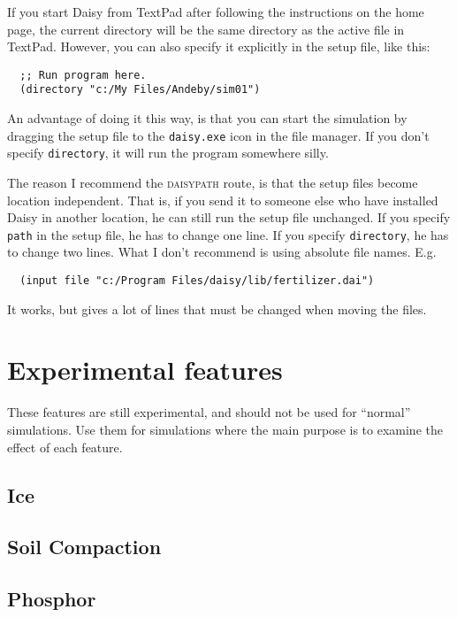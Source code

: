 \documentclass[a4paper]{article}
\begin{document}
If you start Daisy from TextPad after following the instructions on
the home page, the current directory will be the same directory as the
active file in TextPad.  However, you can also specify it explicitly
in the setup file, like this:
\begin{verbatim}
  ;; Run program here.
  (directory "c:/My Files/Andeby/sim01")
\end{verbatim}
An advantage of doing it this way, is that you can start the simulation
by dragging the setup file to the \texttt{daisy.exe} icon in the file
manager.  If you don't specify \texttt{directory}, it will run the
program somewhere silly.

The reason I recommend the \textsc{daisypath} route, is that the setup
files become location independent.  That is, if you send it to someone
else who have installed Daisy in another location, he can still run
the setup file unchanged.  If you specify \texttt{path} in the setup
file, he has to change one line.  If you specify \texttt{directory},
he has to change two lines.  What I don't recommend is using absolute
file names.  E.g.
\begin{verbatim}
  (input file "c:/Program Files/daisy/lib/fertilizer.dai")
\end{verbatim}
It works, but gives a lot of lines that must be changed when moving
the files.

\appendix

\section{Experimental features}
\label{sec:exp}

These features are still experimental, and should not be used for
``normal'' simulations.  Use them for simulations where the main
purpose is to examine the effect of each feature.

\subsection{Ice}
\label{sec:ice}


\subsection{Soil Compaction}
\label{sec:compact}


\subsection{Phosphor}
\label{sec:phosphor}
\end{document}
